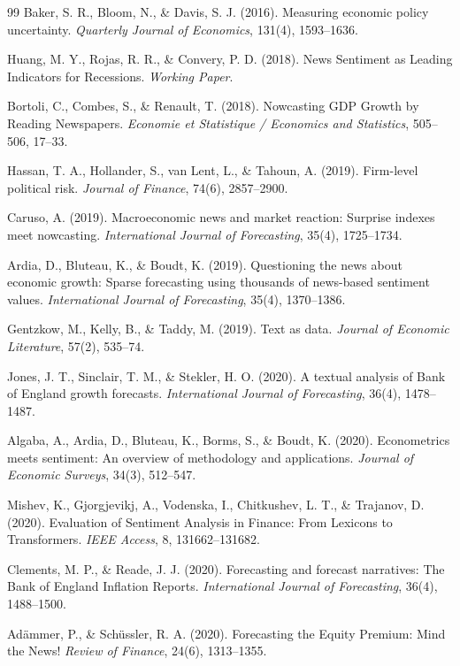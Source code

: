 \documentclass[11pt,twocolumn]{article}
\begin{document}
\begin{thebibliography}{99}
 Baker, S. R., Bloom, N., \& Davis, S. J. (2016). Measuring economic policy uncertainty. \textit{Quarterly Journal of Economics}, 131(4), 1593--1636.

 Huang, M. Y., Rojas, R. R., \& Convery, P. D. (2018). News Sentiment as Leading Indicators for Recessions. \textit{Working Paper}.

 Bortoli, C., Combes, S., \& Renault, T. (2018). Nowcasting GDP Growth by Reading Newspapers. \textit{Economie et Statistique / Economics and Statistics}, 505--506, 17--33.

 Hassan, T. A., Hollander, S., van Lent, L., \& Tahoun, A. (2019). Firm-level political risk. \textit{Journal of Finance}, 74(6), 2857--2900.

 Caruso, A. (2019). Macroeconomic news and market reaction: Surprise indexes meet nowcasting. \textit{International Journal of Forecasting}, 35(4), 1725--1734.

 Ardia, D., Bluteau, K., \& Boudt, K. (2019). Questioning the news about economic growth: Sparse forecasting using thousands of news-based sentiment values. \textit{International Journal of Forecasting}, 35(4), 1370--1386.

 Gentzkow, M., Kelly, B., \& Taddy, M. (2019). Text as data. \textit{Journal of Economic Literature}, 57(2), 535--74.

 Jones, J. T., Sinclair, T. M., \& Stekler, H. O. (2020). A textual analysis of Bank of England growth forecasts. \textit{International Journal of Forecasting}, 36(4), 1478--1487.

 Algaba, A., Ardia, D., Bluteau, K., Borms, S., \& Boudt, K. (2020). Econometrics meets sentiment: An overview of methodology and applications. \textit{Journal of Economic Surveys}, 34(3), 512--547.

 Mishev, K., Gjorgjevikj, A., Vodenska, I., Chitkushev, L. T., \& Trajanov, D. (2020). Evaluation of Sentiment Analysis in Finance: From Lexicons to Transformers. \textit{IEEE Access}, 8, 131662--131682.

 Clements, M. P., \& Reade, J. J. (2020). Forecasting and forecast narratives: The Bank of England Inflation Reports. \textit{International Journal of Forecasting}, 36(4), 1488--1500.

 Adämmer, P., \& Schüssler, R. A. (2020). Forecasting the Equity Premium: Mind the News! \textit{Review of Finance}, 24(6), 1313--1355.


\end{thebibliography}
\end{document}
